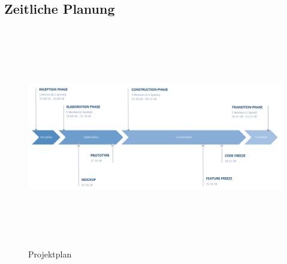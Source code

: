 \begin{landscape}
	\thispagestyle{empty}
	\subsection{Zeitliche Planung}
	\label{subsec:timeline}
		\begin{figure}[h]
			\centering
			\includegraphics[width=1\linewidth, height=9.6cm]{img/projekt-plan/projekt-plan}
			\caption[Projektplan]{Projektplan}
			\label{fig:projekt-plan}
		\end{figure}
\end{landscape}